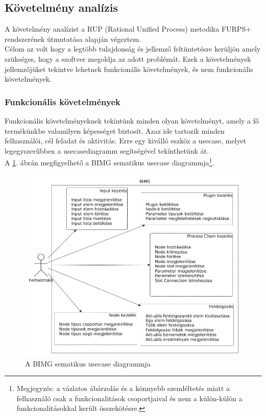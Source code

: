 \documentclass[a4paper,12pt,oneside]{report}
\begin{document}
\subsection{Követelmény analízis}
A követelmény analízist a RUP (Rational Unified Process) metodika FURPS+ rendszerének útmutatása alapján végeztem. \\Célom az volt hogy a legtöbb tulajdonság és jellemző feltüntetésre kerüljön amely szükséges, hogy a szoftver megoldja az adott problémát. \cite{website:soft_req_def} Ezek a követelmények jellemzőjüket tekintve lehetnek funkcionális követelmények, és nem funkcionális követelmények.

\subsubsection{Funkcionális követelmények}
Funkcionális követelményeknek tekintünk minden olyan követelményt, amely a fő termékünkbe valamilyen képességet biztosít. \cite{website:soft_func_req_ibm} Azaz ide tartozik minden felhasználói, cél feladat és aktivitás. Erre egy kiválló eszköz a usecase, melyet legegyszerűbben a usecasediagramm segítségével tekínthetünk át.
\\
A \ref{fig:bimg_usecase_schema}. ábrán megfigyelhető a BIMG sematikus usecase diagrammja\footnote{Megjegyzés: a vázlatos ábárzolás és a könnyebb szemléltetés miatt a felhasználó csak a funkcionalitások csoportjaival és nem a külön-külön a funkcionalitásokkal került összekötésre.}.
\begin{figure}[h]
  \includegraphics[width=\textwidth]{schematic_usecase.png}
  \caption{A BIMG sematikus usecase diagrammja }
  \label{fig:bimg_usecase_schema}
\end{figure}
\end{document}
